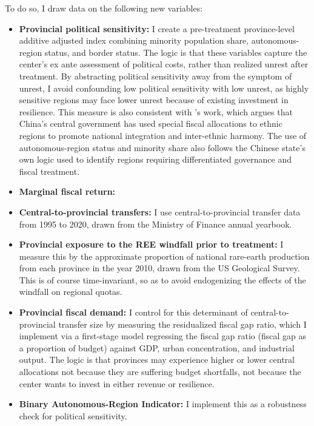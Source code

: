 \documentclass[12pt]{article}
\begin{document}
To do so, I draw data on the following new variables:
\begin{itemize}
    \item \textbf{Provincial political sensitivity:} I create a pre-treatment province-level additive adjusted index combining minority population share, autonomous-region status, and border status. The logic is that these variables capture the center's ex ante assessment of political costs, rather than realized unrest after treatment. By abstracting political sensitivity away from the symptom of unrest, I avoid confounding low political sensitivity with low unrest, as highly sensitive regions may face lower unrest because of existing investment in resilience. This measure is also consistent with \textcite{freeman2012blood}'s work, which argues that China's central government has used special fiscal allocations to ethnic regions to promote national integration and inter-ethnic harmony. The use of autonomous-region status and minority share also follows the Chinese state's own logic used to identify regions requiring differentiated governance and fiscal treatment. 

    \item \textbf{Marginal fiscal return:}
    \item \textbf{Central-to-provincial transfers:} I use central-to-provincial transfer data from 1995 to 2020, drawn from the Ministry of Finance annual yearbook.
    \item \textbf{Provincial exposure to the REE windfall prior to treatment:} I measure this by the approximate proportion of national rare-earth production from each province in the year 2010, drawn from the US Geological Survey. This is of course time-invariant, so as to avoid endogenizing the effects of the windfall on regional quotas.
    \item \textbf{Provincial fiscal demand:} I control for this determinant of central-to-provincial transfer size by measuring the residualized fiscal gap ratio, which I implement via a first-stage model regressing the fiscal gap ratio (fiscal gap as a proportion of budget) against GDP, urban concentration, and industrial output. The logic is that provinces may experience higher or lower central allocations not because they are suffering budget shortfalls, not because the center wants to invest in either revenue or resilience.
    \item \textbf{Binary Autonomous-Region Indicator:} I implement this as a robustness check for political sensitivity.
\end{itemize}
\end{document}
